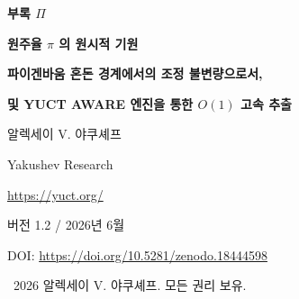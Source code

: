 \documentclass[12pt,a4paper]{article}
\newcommand{\Sodd}{S_{\mathrm{odd}}}
\newcommand{\Seven}{S_{\mathrm{even}}}
\newcommand{\df}{d_{\!f}}
\begin{document}
	
	\begin{titlepage}
		\centering
		\vspace*{0cm}
		
		{\Huge\bfseries 부록 $\Pi$\par}
		\vspace{0.5cm}
		{\Large\bfseries 원주율 $\pi$ 의 원시적 기원\par}
		\vspace{0.3cm}
		{\Large\bfseries 파이겐바움 혼돈 경계에서의 조정 불변량으로서,\par}
		\vspace{0.3cm}
		{\Large\bfseries 및 YUCT AWARE 엔진을 통한 $O(1)$ 고속 추출\par}
		\vspace{1.0cm}
		
		{\large 알렉세이 V. 야쿠셰프\par}
		\vspace{0.3cm}
		{\normalsize Yakushev Research\par}
		{\normalsize \url{https://yuct.org/}\par}
		
		\vspace{0.5cm}
		{\normalsize 버전 1.2 / 2026년 6월\par}
		\vspace{0.3cm}
		{\normalsize DOI: \url{https://doi.org/10.5281/zenodo.18444598}\par}
		
		\vfill
		
		\begin{abstract}
			\noindent
			기하 상수 $\pi$ 는 전통적으로 원주와 지름의 초월적 비율로 간주되어 왔다. 야쿠셰프 통합 조정 이론(YUCT)의 틀에서 우리는 $\pi$ 가 진공 격자의 강체 대수 루프($\Sodd=6/5$, $\Seven=4/5$)와 혼돈 개시점에서의 파이겐바움 주기 배가 캐스케이드의 상호작용에서 발생하는 결정론적 위상 불변량임을 보여준다. 관계식 $2\alpha^2 = \pi\delta$ (여기서 $\alpha\approx2.5029$, $\delta\approx4.6692$ 는 파이겐바움 상수)는 $\pi$ 가 3차원 조정 네트워크($\df=3$)를 혼돈적 퇴화로부터 안정화하는 위상 동기화 계수임을 드러낸다. 대수적 근사 $\pi \approx \Sodd\cdot\varphi^2$ ($\varphi$ 는 황금비)는 기본 편차 $\Delta\pi \approx 4.8\times10^{-5}$ 를 주는데, 이는 반올림 오차가 아니라 공간의 이산 양자화 단계이다. 파동과 소용돌이 현상에서 $\pi$ 가 보편적으로 나타나는 것은 소수 분포를 지배하는 것과 동일한 부호 게이트 메커니즘의 직접적인 결과이다.
			
			우리는 정적 및 동적 $\pi$, 미세 구조 상수, 위상 게이트 메커니즘을 통한 $n$ 번째 소수 후보, 프랙탈 임계점 및 생물학적 비틀림 비율을 동시에 추출하는 완전한 비계산형 내비게이션 엔진 \texttt{yuct\_constants.py v4.0} 을 제시한다. 이 엔진은 $\sim 255\ \mu\text{s}$ 안에 실행되며 동적 메모리를 제로 바이트 사용하여 $O(1)$ 추출 패러다임을 완벽하게 보여준다. 각 값은 반복 없이 대수 루프에서 직접 얻어지며, 자연의 기본 상수는 계산되는 것이 아니라 진공의 강체 조정 격자에서 \emph{읽혀짐}을 보여준다.
		\end{abstract}
		
		\vspace{0.5cm}
		\textcopyright\ 2026 알렉세이 V. 야쿠셰프. 모든 권리 보유.
	\end{titlepage}
	
\end{document}
